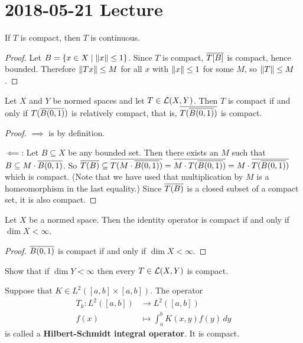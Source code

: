 \section{2018-05-21 Lecture}

\begin{prop}
  If $T$ is compact, then $T$ is continuous.
\end{prop}

\begin{proof}
  Let $B = \{ x \in X \mid \left\lVert x \right\rVert \leq 1 \}$.
  Since $T$ is compact, $\overline{T[B]}$ is compact, hence bounded.
  Therefore $\left\lVert Tx \right\rVert \leq M$ for all $x$ with $\left\lVert x \right\rVert \leq 1$ for some $M$, so $\left\lVert T \right\rVert \leq M$.
\end{proof}

\begin{prop}
  Let $X$ and $Y$ be normed spaces and let $T \in \mathcal{L}(X,Y)$.
  Then $T$ is compact if and only if $T(\overline{B(0,1)})$ is relatively compact, that is, $\overline{T(\overline{B(0,1)})}$ is compact.
\end{prop}

\begin{proof}
  $\implies$ is by definition.

  $\impliedby$: Let $B \subseteq X$ be any bounded set.
  Then there exists an $M$ such that $B \subseteq M \cdot \overline{B(0,1)}$.
  So $\overline{T(B)} \subseteq \overline{T(M \cdot \overline{B(0,1)})} = \overline{M \cdot T(\overline{B(0,1)})} = M \cdot \overline{T(\overline{B(0,1)})}$ which is compact.
  (Note that we have used that multiplication by $M$ is a homeomorphism in the last equality.)
  Since $\overline{T(B)}$ is a closed subset of a compact set, it is also compact.
\end{proof}

\begin{prop}
  Let $X$ be a normed space.
  Then the identity operator is compact if and only if $\dim X < \infty$.
\end{prop}

\begin{proof}
  $\overline{B(0,1)}$ is compact if and only if $\dim X < \infty$.
\end{proof}

\begin{exer}
  Show that if $\dim Y < \infty$ then every $T \in \mathcal{L}(X,Y)$ is compact.
\end{exer}

\begin{exam}
  Suppose that $K \in L^2([a,b] \times [a,b])$.
  The operator
  \begin{align*}
    T_k: L^2([a,b]) &\to L^2([a,b]) \\
    f(x) &\mapsto \int_{a}^{b} K(x,y) f(y) \, dy
  \end{align*}
  is called a \textbf{Hilbert-Schmidt integral operator}.
  It is compact.
\end{exam}

